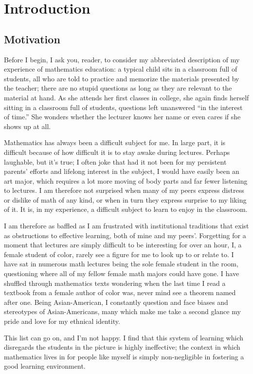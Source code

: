 \chapter{Introduction}
\section{Motivation}

Before I begin, I ask you, reader, to consider my abbreviated description of my experience of mathematics education: a typical child sits in a classroom full of students, all who are told to practice and memorize the materials presented by the teacher; there are no stupid questions as long as they are relevant to the material at hand. As she attends her first classes in college, she again finds herself sitting in a classroom full of students, questions left unanswered ``in the interest of time.'' She wonders whether the lecturer knows her name or even cares if she shows up at all.

Mathematics has always been a difficult subject for me. In large part, it is difficult because of how difficult it is to stay awake during lectures. Perhaps laughable, but it's true; I often joke that had it not been for my persistent parents' efforts and lifelong interest in the subject, I would have easily been an art major, which requires a lot more moving of body parts and far fewer listening to lectures. I am therefore not surprised when many of my peers express distress or dislike of math of any kind, or when in turn they express surprise to my liking of it. It is, in my experience, a difficult subject to learn to enjoy in the classroom.

I am therefore as baffled as I am frustrated with institutional traditions that exist as obstructions to effective learning, both of mine and my peers'. Forgetting for a moment that lectures are simply difficult to be interesting for over an hour, I, a female student of color, rarely see a figure for me to look up to or relate to. I have sat in numerous math lectures being the sole female student in the room, questioning where all of my fellow female math majors could have gone. I have shuffled through mathematics texts wondering when the last time I read a textbook from a female author of color was, never mind see a theorem named after one. Being Asian-American, I constantly question and face biases and stereotypes of Asian-Americans, many which make me take a second glance my pride and love for my ethnical identity.

This list can go on, and I'm not happy. I find that this system of learning which disregards the students in the picture is highly ineffective; the context in which mathematics lives in for people like myself is simply non-negligible in fostering a good learning environment.

